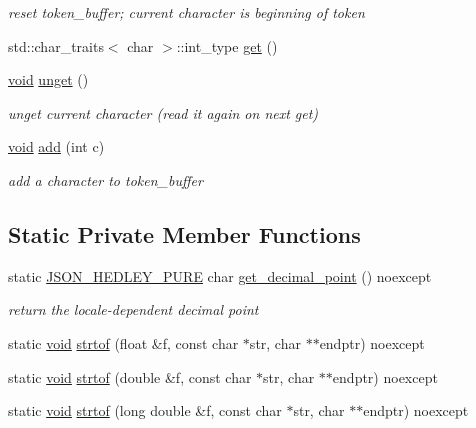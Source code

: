 \begin{DoxyCompactItemize}
\begin{DoxyCompactList}\small\item\em reset token\+\_\+buffer; current character is beginning of token \end{DoxyCompactList}\item 
std\+::char\+\_\+traits$<$ char $>$\+::int\+\_\+type \mbox{\hyperlink{classnlohmann_1_1detail_1_1lexer_a901e45a34e1fb1d97ab62350b0c3ef26}{get}} ()
\item 
\mbox{\hyperlink{namespacenlohmann_1_1detail_a59fca69799f6b9e366710cb9043aa77d}{void}} \mbox{\hyperlink{classnlohmann_1_1detail_1_1lexer_a626f145768762057dc68a4666eb577db}{unget}} ()
\begin{DoxyCompactList}\small\item\em unget current character (read it again on next get) \end{DoxyCompactList}\item 
\mbox{\hyperlink{namespacenlohmann_1_1detail_a59fca69799f6b9e366710cb9043aa77d}{void}} \mbox{\hyperlink{classnlohmann_1_1detail_1_1lexer_acec899d31af1fd647911e46e8535c283}{add}} (int c)
\begin{DoxyCompactList}\small\item\em add a character to token\+\_\+buffer \end{DoxyCompactList}\end{DoxyCompactItemize}
\subsection*{Static Private Member Functions}
\begin{DoxyCompactItemize}
\item 
static \mbox{\hyperlink{json_8hpp_af5c84b7d1a43361bdc14cc6941078000}{J\+S\+O\+N\+\_\+\+H\+E\+D\+L\+E\+Y\+\_\+\+P\+U\+RE}} char \mbox{\hyperlink{classnlohmann_1_1detail_1_1lexer_ae90334f30e7c12d5394c116bcfecac19}{get\+\_\+decimal\+\_\+point}} () noexcept
\begin{DoxyCompactList}\small\item\em return the locale-\/dependent decimal point \end{DoxyCompactList}\item 
static \mbox{\hyperlink{namespacenlohmann_1_1detail_a59fca69799f6b9e366710cb9043aa77d}{void}} \mbox{\hyperlink{classnlohmann_1_1detail_1_1lexer_a1a2d4cc5d9fed4783aa2a98497925511}{strtof}} (float \&f, const char $\ast$str, char $\ast$$\ast$endptr) noexcept
\item 
static \mbox{\hyperlink{namespacenlohmann_1_1detail_a59fca69799f6b9e366710cb9043aa77d}{void}} \mbox{\hyperlink{classnlohmann_1_1detail_1_1lexer_a8cd877d10b31bc819e4f030292737ea6}{strtof}} (double \&f, const char $\ast$str, char $\ast$$\ast$endptr) noexcept
\item 
static \mbox{\hyperlink{namespacenlohmann_1_1detail_a59fca69799f6b9e366710cb9043aa77d}{void}} \mbox{\hyperlink{classnlohmann_1_1detail_1_1lexer_a0e28dda9a1e007d55d03e8d39dd3b9fa}{strtof}} (long double \&f, const char $\ast$str, char $\ast$$\ast$endptr) noexcept
\end{DoxyCompactItemize}
